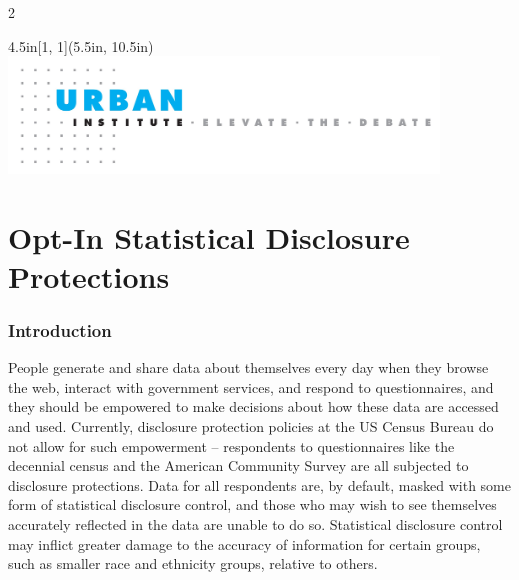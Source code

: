 \documentclass[
]{urban-formatting}
\begin{document}
\begin{titlepage}
\begin{multicols}{2}
      
    \end{multicols}
    

    \begin{textblock*}{4.5in}[1, 1](5.5in, 10.5in)
        \noindent\includegraphics[width=4.5in]{images/cover-footer.jpg}
    \end{textblock*}
\end{titlepage}



\cleardoublepage

\setcounter{page}{3}
\begin{singlespace}
    \tableofcontents
\end{singlespace}

\thispagestyle{empty}





\part{Opt-In Statistical Disclosure Protections}

\section{Introduction}

People generate and share data about themselves every day when they
browse the web, interact with government services, and respond to
questionnaires, and they should be empowered to make decisions about how
these data are accessed and used. Currently, disclosure protection
policies at the US Census Bureau do not allow for such empowerment --
respondents to questionnaires like the decennial census and the American
Community Survey are all subjected to disclosure protections. Data for
all respondents are, by default, masked with some form of statistical
disclosure control, and those who may wish to see themselves accurately
reflected in the data are unable to do so. Statistical disclosure
control may inflict greater damage to the accuracy of information for
certain groups, such as smaller race and ethnicity groups, relative to
others.
\end{document}
